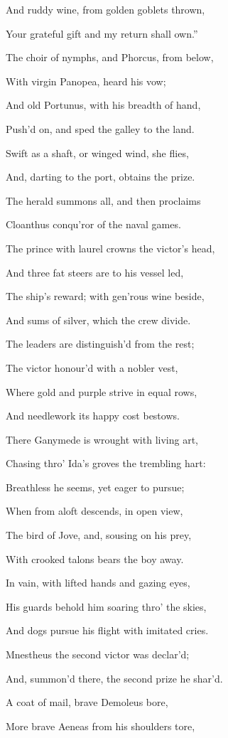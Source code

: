 And ruddy wine, from golden goblets thrown,

Your grateful gift and my return shall own.”

The choir of nymphs, and Phorcus, from below,

With virgin Panopea, heard his vow;

And old Portunus, with his breadth of hand,

Push’d on, and sped the galley to the land.

Swift as a shaft, or winged wind, she flies,

And, darting to the port, obtains the prize.

The herald summons all, and then proclaims

Cloanthus conqu’ror of the naval games.

The prince with laurel crowns the victor’s head,

And three fat steers are to his vessel led,

The ship’s reward; with gen’rous wine beside,

And sums of silver, which the crew divide.

The leaders are distinguish’d from the rest;

The victor honour’d with a nobler vest,

Where gold and purple strive in equal rows,

And needlework its happy cost bestows.

There Ganymede is wrought with living art,

Chasing thro’ Ida’s groves the trembling hart:

Breathless he seems, yet eager to pursue;

When from aloft descends, in open view,

The bird of Jove, and, sousing on his prey,

With crooked talons bears the boy away.

In vain, with lifted hands and gazing eyes,

His guards behold him soaring thro’ the skies,

And dogs pursue his flight with imitated cries.

Mnestheus the second victor was declar’d;

And, summon’d there, the second prize he shar’d.

A coat of mail, brave Demoleus bore,

More brave Aeneas from his shoulders tore,

